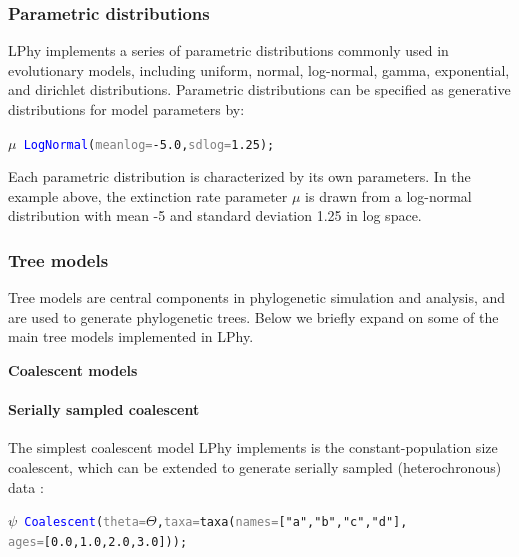 \documentclass[10pt,letterpaper,table]{article}
\theoremstyle{definition}
\begin{document}
\subsubsection{Parametric distributions}
LPhy implements a series of parametric distributions commonly used in evolutionary models, including uniform, normal, log-normal, gamma, exponential, and dirichlet distributions. 
Parametric distributions can be specified as generative distributions for model parameters by:

{\small
\begin{alltt}
    \textcolor{bluishgreen}{\(\mu\)} ~ \textcolor{blue}{LogNormal}(\textcolor{gray}{meanlog=}\textcolor{constant}{-5.0}, \textcolor{gray}{sdlog=}\textcolor{constant}{1.25});
\end{alltt}}

Each parametric distribution is characterized by its own parameters. 
In the example above, the extinction rate parameter $\mu$ is drawn from a log-normal distribution with mean -5 and standard deviation 1.25 in log space.

\subsubsection{Tree models}
\label{sec:treeprior}
Tree models are central components in phylogenetic simulation and analysis, and are used to generate phylogenetic trees. Below we briefly expand on some of the main tree models implemented in LPhy.
\newline

\noindent \textbf{Coalescent models}
\paragraph{Serially sampled coalescent}
The simplest coalescent model LPhy implements is the constant-population size coalescent, which can be extended to generate serially sampled (heterochronous) data \cite{Rodrigo1999SerialCoalescent}:
{\small
  \begin{alltt}
    \textcolor{bluishgreen}{\(\psi\)} ~ \textcolor{blue}{Coalescent}(\textcolor{gray}{theta=}\textcolor{bluishgreen}{\(\Theta\)}, \textcolor{gray}{taxa=}\textcolor{generator}{taxa}(\textcolor{gray}{names=}[\textcolor{constant}{"a"}, \textcolor{constant}{"b"}, \textcolor{constant}{"c"}, \textcolor{constant}{"d"}], 
      \textcolor{gray}{ages=}[\textcolor{constant}{0.0}, \textcolor{constant}{1.0}, \textcolor{constant}{2.0}, \textcolor{constant}{3.0}]));
  \end{alltt}
}
\end{document}
